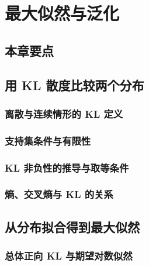\chapter{最大似然与泛化}
\label{chap:mle}

\section*{本章要点}
\contentplaceholder

\section{用 KL 散度比较两个分布}
\label{sec:mle-kl}
\contentplaceholder

\subsection{离散与连续情形的 KL 定义}
\label{subsec:mle-definition}
\contentplaceholder

\subsection{支持集条件与有限性}
\label{subsec:mle-support}
\contentplaceholder

\subsection{KL 非负性的推导与取等条件}
\label{subsec:mle-nonnegativity}
\contentplaceholder

\subsection{熵、交叉熵与 KL 的关系}
\label{subsec:mle-entropy}
\contentplaceholder

\section{从分布拟合得到最大似然}
\label{sec:mle-distribution-fitting}
\contentplaceholder

\subsection{总体正向 KL 与期望对数似然}
\label{subsec:mle-population}
\contentplaceholder

